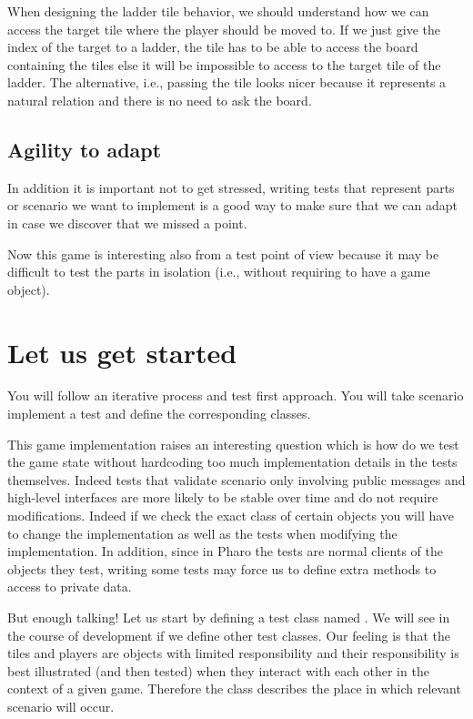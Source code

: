 \documentclass[10pt,twoside,english]{_support/latex/sbabook/sbabook}
\begin{document}
When designing the ladder tile behavior, we should understand how we can
access the target tile where the player should be moved to. 
If we just give the index of the target to a ladder, the tile has to be able to access the board containing the tiles else it will be impossible to access to the target tile of the ladder. The alternative, i.e., passing the tile looks nicer because it represents a natural relation and there is no need to ask the board. 
\subsection{Agility to adapt}
In addition it is important not to get stressed, writing tests that represent parts  or scenario 
we want to implement is a good way to make sure that we can adapt in case we discover that we missed a point. 

Now this game is interesting also from a test point of view because it may be difficult to test the parts in isolation (i.e., without requiring to have a game object).
\section{Let us get started}
You will follow an iterative process and test first approach. You will take scenario implement a test and define the corresponding classes. 

This game implementation raises an interesting question which is how do we test the game state
without hardcoding too much implementation details in the tests themselves. Indeed tests that validate scenario only involving public messages and high-level interfaces are more likely to be stable over time and do not require modifications. Indeed if we check the exact class of certain objects you will have to change the implementation as well as the tests when modifying the implementation. In addition, since in Pharo the tests are normal clients of the objects they test, writing some tests may force us to define extra methods to access to private data. 

But enough talking! 
Let us start by defining a test class named . We will see in the course of development if we define other test classes. Our feeling is that the tiles and players are objects with limited responsibility and their responsibility is best illustrated (and then tested) when they interact with each other in the context of a given game. Therefore
the class  describes the place in which relevant scenario will occur. 
\end{document}
